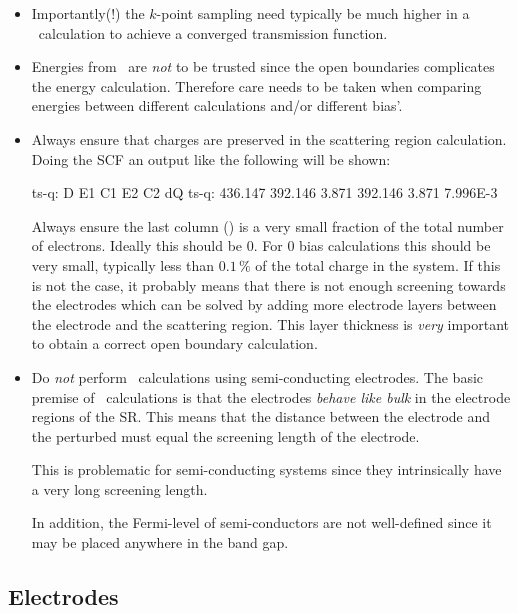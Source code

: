 \begin{itemize}
  \item%
  Importantly(!) the $k$-point sampling need typically be much higher
  in a \tbtrans\ calculation to achieve a converged transmission
  function.

  \item%
  Energies from \tsiesta\ are \emph{not} to be trusted since the open
  boundaries complicates the energy calculation. Therefore care needs
  to be taken when comparing energies between different calculations
  and/or different bias'.

  \item%
  Always ensure that charges are preserved in the scattering region
  calculation. Doing the SCF an output like the following will be shown:
  \begin{output}[fontsize=\footnotesize]
ts-q:         D        E1        C1        E2        C2        dQ
ts-q:   436.147   392.146     3.871   392.146     3.871  7.996E-3
  \end{output}
  Always ensure the last column () is a very small fraction of
  the total number of electrons. Ideally this should be $0$.
  For $0$ bias calculations this should be very small, typically less
  than $0.1\,\%$ of the total charge in the system. If this is not the
  case, it probably means that there is not enough screening towards the
  electrodes which can be solved by adding more electrode layers between
  the electrode and the scattering region. This layer thickness is
  \emph{very} important to obtain a correct open boundary calculation.

  \item%
  Do \emph{not} perform \tsiesta\ calculations using semi-conducting
  electrodes. The basic premise of \tsiesta\ calculations is that the
  electrodes \emph{behave like bulk} in the electrode regions of the
  SR. This means that the distance between the electrode and the
  perturbed must equal the screening length of the electrode.

  This is problematic for semi-conducting systems since they
  intrinsically have a very long screening length.

  In addition, the Fermi-level of semi-conductors are not well-defined
  since it may be placed anywhere in the band gap.

\end{itemize}


\subsection{Electrodes}

